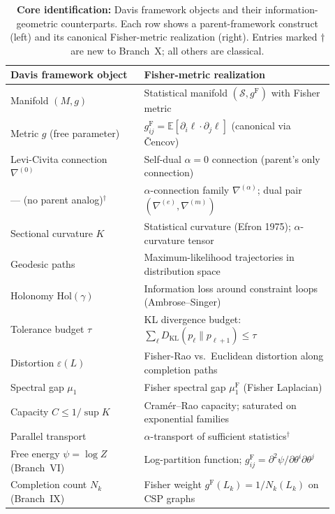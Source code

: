 \documentclass[11pt]{article}
\newcommand{\E}{\mathbb{E}}
\newcommand{\gF}{g^{\mathrm{F}}}
\theoremstyle{remark}
\begin{document}
\tableofcontents
\newpage


\begin{table}[htbp]
\centering
\caption{\textbf{Core identification:} Davis framework objects and their
information-geometric counterparts.  Each row shows a parent-framework
construct (left) and its canonical Fisher-metric realization (right).
Entries marked $\dagger$ are new to Branch~X; all others are classical.}
\label{tab:identification}
\begin{tabularx}{\linewidth}{@{}p{0.38\linewidth}p{0.54\linewidth}@{}}
\toprule
\textbf{Davis framework object} & \textbf{Fisher-metric realization} \\
\midrule
Manifold $(M, g)$ &
Statistical manifold $(\mathcal{S}, \gF)$ with Fisher metric \\
\addlinespace[2pt]
Metric $g$ (free parameter) &
$\gF_{ij} = \E[\partial_i \ell \cdot \partial_j \ell]$ (canonical via \v{C}encov) \\
\addlinespace[2pt]
Levi-Civita connection $\nabla^{(0)}$ &
Self-dual $\alpha = 0$ connection (parent's only connection) \\
\addlinespace[2pt]
--- (no parent analog)$^\dagger$ &
$\alpha$-connection family $\nabla^{(\alpha)}$; dual pair $(\nabla^{(e)}, \nabla^{(m)})$ \\
\addlinespace[2pt]
Sectional curvature $K$ &
Statistical curvature (Efron 1975); $\alpha$-curvature tensor \\
\addlinespace[2pt]
Geodesic paths &
Maximum-likelihood trajectories in distribution space \\
\addlinespace[2pt]
Holonomy $\mathrm{Hol}(\gamma)$ &
Information loss around constraint loops (Ambrose--Singer) \\
\addlinespace[2pt]
Tolerance budget $\tau$ &
KL divergence budget: $\sum_\ell D_{\mathrm{KL}}(p_\ell \| p_{\ell+1}) \le \tau$ \\
\addlinespace[2pt]
Distortion $\varepsilon(L)$ &
Fisher-Rao vs.\ Euclidean distortion along completion paths \\
\addlinespace[2pt]
Spectral gap $\mu_1$ &
Fisher spectral gap $\mu_1^{\mathrm{F}}$ (Fisher Laplacian) \\
\addlinespace[2pt]
Capacity $C \le 1/\sup K$ &
Cram\'er--Rao capacity; saturated on exponential families \\
\addlinespace[2pt]
Parallel transport &
$\alpha$-transport of sufficient statistics$^\dagger$ \\
\addlinespace[2pt]
Free energy $\psi = \log Z$ (Branch~VI) &
Log-partition function; $\gF_{ij} = \partial^2\psi / \partial\theta^i\partial\theta^j$ \\
\addlinespace[2pt]
Completion count $N_k$ (Branch~IX) &
Fisher weight $\gF(L_k) = 1/N_k(L_k)$ on CSP graphs \\
\bottomrule
\end{tabularx}
\end{table}
\end{document}
